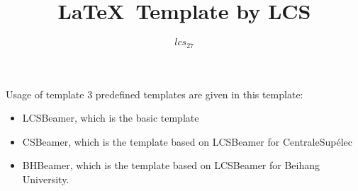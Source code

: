 \documentclass[english]{BHBeamer}
\title{\LaTeX \ Template by LCS} %
\author{$lcs_{27}$}
\begin{document}
    \begin{frame}
        \maketitle
    \end{frame} 

    \begin{frame}{Usage of template}
    3 predefined templates are given in this template:
        \begin{itemize}
            \item LCSBeamer, which is the basic template
            \item CSBeamer, which is the template based on LCSBeamer for CentraleSupélec
            \item BHBeamer, which is the template based on LCSBeamer for Beihang University.
        \end{itemize}\par
    \end{frame} 
\end{document}
